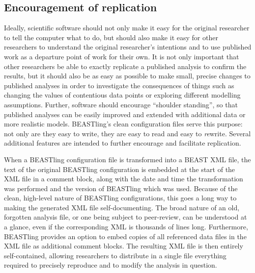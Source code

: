 \documentclass[10pt,a4paper]{article}
\begin{document}

\subsection{Encouragement of replication}

Ideally, scientific software should not only make it easy for the original researcher to tell the computer what to do, but should also make it easy for other researchers to understand the original researcher's intentions and to use published work as a departure point of work for their own.  It is not only important that other researchers be able to exactly replicate a published analysis to confirm the results, but it should also be as easy as possible to make small, precise changes to published analyses in order to investigate the consequences of things such as changing the values of contentious data points or exploring different modelling assumptions.  Further, software should encourage ``shoulder standing'', so that published analyses can be easily improved and extended with additional data or more realistic models.  BEASTling's clean configuration files serve this purpose: not only are they easy to write, they are easy to read and easy to \emph{re}write.  Several additional features are intended to further encourage and facilitate replication.

When a BEASTling configuration file is transformed into a BEAST XML file, the text of the original BEASTling configuration is embedded at the start of the XML file in a comment block, along with the date and time the transformation was performed and the version of BEASTling which was used.  Because of the clean, high-level nature of BEASTling configurations, this goes a long way to making the generated XML file self-documenting.  The broad nature of an old, forgotten analysis file, or one being subject to peer-review, can be understood at a glance, even if the corresponding XML is thousands of lines long.  Furthermore, BEASTling provides an option to embed copies of all referenced data files in the XML file as additional comment blocks.  The resulting XML file is then entirely self-contained, allowing researchers to distribute in a single file everything required to precisely reproduce and to modify the analysis in question.
\end{document}
